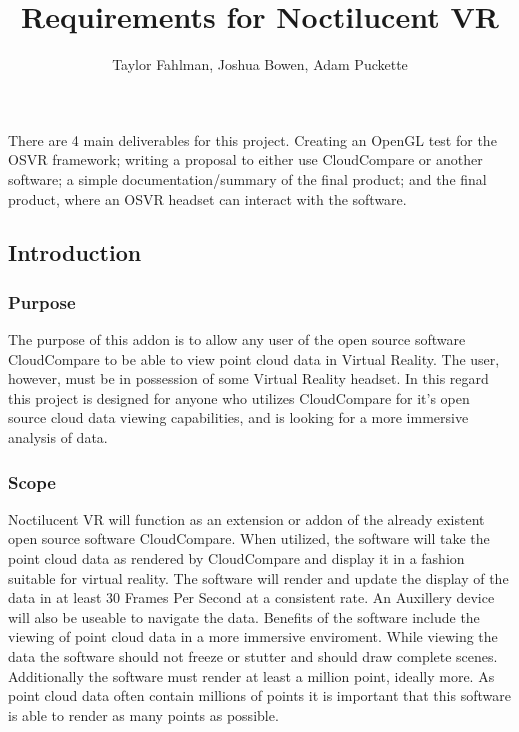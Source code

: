 
\title {Requirements for Noctilucent VR}
\author {Taylor Fahlman, Joshua Bowen, Adam Puckette}

\maketitle

\abstract
There are 4 main deliverables for this project. Creating an OpenGL test for the OSVR framework;
writing a proposal to either use CloudCompare or another software; a simple documentation/summary of
the final product; and the final product, where an OSVR headset can interact with the software.

\newpage
\thispagestyle{empty}
\mbox{}

\subsection{Introduction}
\subsubsection{Purpose}

The purpose of this addon is to allow any user of the open source software CloudCompare to be able to view point cloud data in Virtual Reality.
The user, however, must be in possession of some Virtual Reality headset.
In this regard this project is designed for anyone who utilizes CloudCompare for it's open source cloud data viewing capabilities,
and is looking for a more immersive analysis of data.

\subsubsection{Scope}

Noctilucent VR will function as an extension or addon of the already existent open source software CloudCompare.
When utilized, the software will take the point cloud data as rendered by CloudCompare and display it in a fashion suitable for virtual reality.
The software will render and update the display of the data in at least 30 Frames Per Second at a consistent rate.
An Auxillery device will also be useable to navigate the data.
Benefits of the software include the viewing of point cloud data in a more immersive enviroment.
While viewing the data the software should not freeze or stutter and should draw complete scenes. 
Additionally the software must render at least a million point, ideally more.
As point cloud data often contain millions of points it is important that this software is able to render as many points as possible.

